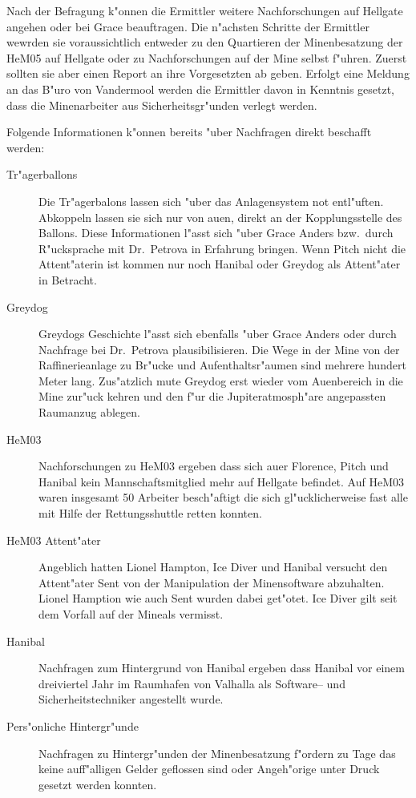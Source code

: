 Nach der Befragung k"onnen die Ermittler weitere Nachforschungen auf Hellgate angehen oder bei Grace beauftragen. Die n"achsten Schritte der Ermittler wewrden sie voraussichtlich entweder zu den Quartieren der Minenbesatzung der HeM05 auf Hellgate oder zu Nachforschungen auf der Mine selbst f"uhren. Zuerst sollten sie aber einen Report an ihre Vorgesetzten ab geben. Erfolgt eine Meldung an das B"uro von Vandermool werden die Ermittler davon in Kenntnis gesetzt, dass die Minenarbeiter aus Sicherheitsgr"unden verlegt werden.


Folgende Informationen k"onnen bereits "uber Nachfragen direkt beschafft werden:

\begin{description}
	\item[Tr"agerballons] Die Tr"agerbalons lassen sich "uber das Anlagensystem not entl"uften. Abkoppeln lassen sie sich nur von au\3en, 
		direkt an der Kopplungsstelle des Ballons. Diese Informationen l"asst sich "uber Grace Anders bzw.~durch R"ucksprache mit Dr.~Petrova in Erfahrung bringen. Wenn Pitch nicht die Attent"aterin ist kommen nur noch Hanibal oder Greydog als Attent"ater in Betracht.
	\item[Greydog] Greydogs Geschichte l"asst sich ebenfalls "uber Grace Anders oder durch Nachfrage bei Dr.~Petrova plausibilisieren. Die 
		Wege in der Mine von der Raffinerieanlage zu Br"ucke und Aufenthaltsr"aumen sind mehrere hundert Meter lang. Zus"atzlich mu\3te Greydog erst wieder vom Au\3enbereich in die Mine zur"uck kehren und den f"ur die Jupiteratmosph"are angepassten Raumanzug ablegen.
	\item[HeM03] Nachforschungen zu HeM03 ergeben dass sich au\3er Florence, Pitch und Hanibal kein Mannschaftsmitglied mehr auf Hellgate befindet. Auf HeM03 waren insgesamt 50 Arbeiter besch"aftigt die sich gl"ucklicherweise fast alle mit Hilfe der Rettungsshuttle retten konnten. 
	\item[HeM03 Attent"ater] Angeblich hatten Lionel Hampton, Ice Diver und Hanibal versucht den Attent"ater Sent von der Manipulation der 
		Minensoftware abzuhalten. Lionel Hamption wie auch Sent wurden dabei get"otet. Ice Diver gilt seit dem Vorfall auf der Mineals vermisst.
	\item[Hanibal] Nachfragen zum Hintergrund von Hanibal ergeben dass Hanibal vor einem dreiviertel Jahr im Raumhafen von Valhalla als 
		Software-- und Sicherheitstechniker angestellt wurde.
	\item[Pers"onliche Hintergr"unde] Nachfragen zu Hintergr"unden der Minenbesatzung f"ordern zu Tage das keine auff"alligen Gelder 
		geflossen sind oder Angeh"orige unter Druck gesetzt werden konnten.
\end{description}

